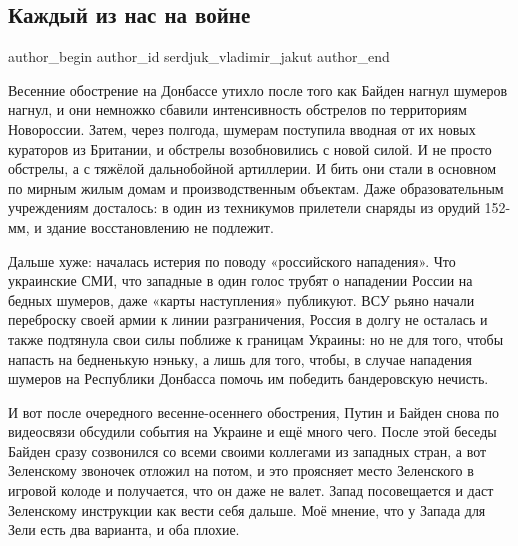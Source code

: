  
 
 
 
 
\subsection{Каждый из нас на войне}
\label{sec:09_12_2021.stz.news.nvr.voshod_info.1.kazhdyj_iz_nas_na_vojne}

\ifcmt
 author_begin
   author_id serdjuk_vladimir_jakut
 author_end
\fi

Весенние обострение на Донбассе утихло после того как Байден нагнул шумеров
нагнул, и они немножко сбавили интенсивность обстрелов по территориям
Новороссии. Затем, через полгода, шумерам поступила вводная от их новых
кураторов из Британии, и обстрелы возобновились с новой силой. И не просто
обстрелы, а с тяжёлой дальнобойной артиллерии. И бить они стали в основном по
мирным жилым домам и производственным объектам. Даже образовательным
учреждениям досталось: в один из техникумов прилетели снаряды из орудий 152-мм,
и здание восстановлению не подлежит.


Дальше хуже: началась истерия по поводу «российского нападения». Что украинские
СМИ, что западные в один голос трубят о нападении России на бедных шумеров,
даже «карты наступления» публикуют. ВСУ рьяно начали переброску своей армии к
линии разграничения, Россия в долгу не осталась и также подтянула свои силы
поближе к границам Украины: но не для того, чтобы напасть на бедненькую нэньку,
а лишь для того, чтобы, в случае нападения шумеров на Республики Донбасса
помочь им победить бандеровскую нечисть.

И вот после очередного весенне-осеннего обострения, Путин и Байден снова по
видеосвязи обсудили события на Украине и ещё много чего. После этой беседы
Байден сразу созвонился со всеми своими коллегами из западных стран, а вот
Зеленскому звоночек отложил на потом, и это проясняет место Зеленского в
игровой колоде и получается, что он даже не валет. Запад посовещается и даст
Зеленскому инструкции как вести себя дальше. Моё мнение, что у Запада для Зели
есть два варианта, и оба плохие.

